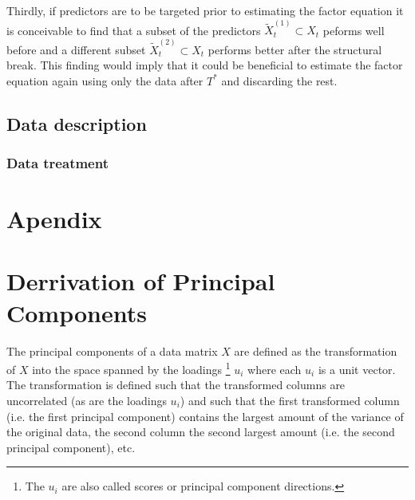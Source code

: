 \documentclass[11pt]{article}
\begin{document}
Thirdly, if predictors are to be targeted prior to estimating the factor equation it is conceivable to find that a subset of the predictors $\tilde X_t^{(1)} \subset X_t$ peforms well before and a different subset $\tilde X_t^{(2)} \subset X_t$ performs better after the structural break. This finding would imply that it could be beneficial to estimate the factor equation again using only the data after $T^*$ and discarding the rest.


\subsection{Data description}
\subsubsection{Data treatment}



\newpage
\appendix
\section*{Apendix}

\section{Derrivation of Principal Components}
\label{Derrivation of Principal Components}
The principal components of a data matrix $X$ are defined as the transformation of $X$ into the space spanned by the loadings \footnote{The $u_i$ are also called scores or principal component directions.} $u_i$ where each $u_i$ is a unit vector. The transformation is defined such that the transformed columns are uncorrelated (as are the loadings $u_i$) and such that the first transformed column (i.e. the first principal component) contains the largest amount of the variance of the original data, the second column the second largest amount (i.e. the second principal component), etc. \\
\end{document}
